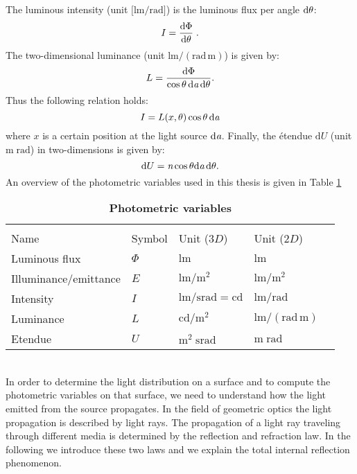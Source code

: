 The luminous intensity \big(unit $\big[\textrm{lm}/\textrm{rad}\big]$\big) is the luminous flux per angle $\textrm{d}\theta$:
 \begin{equation}
 I=\frac{\textrm{d}\Phi}{\textrm{d}\theta}\;.
 \end{equation}
 The two-dimensional luminance (unit $\textrm{lm}/(\textrm{rad}\,\textrm{m})$) is given by:
 \begin{equation}
 L= \frac{\textrm {d}\Phi}{\cos\theta\,\textrm{d}\textit{a} \,\textrm{d}\theta}.
 \end{equation}
 Thus the following relation holds:
 \begin{equation}
 I = L(x, \theta)\cos\theta\,\textrm{d}\textit{a}
 \end{equation}
where $x$ is a certain position at the light source $\textrm{d}\textit{a}$. 
 Finally, the \'{e}tendue $\textrm{d}U $ (unit $\textrm{m}\;\textrm{rad}$) in two-dimensions is given by:
\begin{equation}\label{etendue2d}
\textrm{d}U = \textit{n}\cos\theta\textrm{d}\textit{a}\,\textrm{d}\theta.
\end{equation}
An overview of the photometric variables used in this thesis is given in Table \ref{tab:photometric_variables}
\begin{table}[t] 
\centering
\caption{\bf Photometric variables}
\begin{tabular}{lllll}
 \hline   \\
Name  & Symbol & Unit ($3D$) & Unit ($2D$) \\
  \hline 
Luminous flux & $\Phi$   & $\textrm{lm}$   &  $\textrm{lm}$ \\
Illuminance/emittance  & $E$    & $\textrm{lm}/{\textrm{m}^2} $ & $\textrm{lm}/{\textrm{m}^2}$  \\
Intensity  & $I$    & $\textrm{lm}/{\textrm{srad}} = \textrm{cd}$  & $\textrm{lm}/\textrm{rad}$ \\
Luminance  & $L$  & $ \textrm{cd}/{\textrm{m}^2}$   & $\textrm{lm}/(\textrm{rad} \,\textrm{m})$ \\
Etendue & $U$  & $\textrm{m}^2\; \textrm{srad}$   & $\textrm{m}\; \textrm{rad}$ \\
 \hline
 \end{tabular}
\label{tab:photometric_variables}
 \end{table}
\\ \indent In order to determine the light distribution on a surface and to compute the photometric variables on that surface, we need to understand how the light emitted from the source propagates. In the field of geometric optics the light propagation is described by light rays.
The propagation of a light ray traveling through different media is determined by the reflection and refraction law.
In the following we introduce these two laws and we explain the total internal reflection phenomenon.
